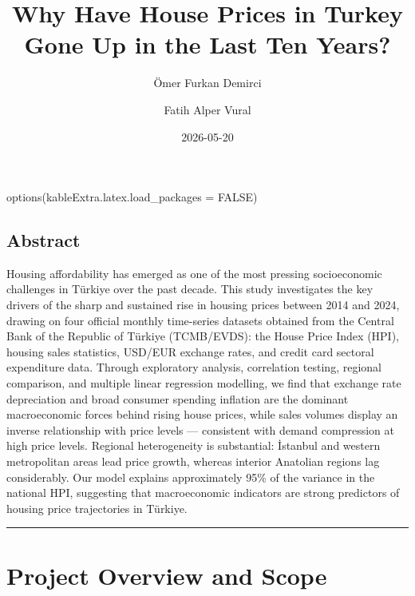\documentclass[
  11pt,
  a4paper,
]{article}
\title{Why Have House Prices in Turkey Gone Up in the Last Ten Years?}
\author{Ömer Furkan Demirci \and Fatih Alper Vural}
\date{2026-05-20}
\newenvironment{Shaded}{\begin{snugshade}}{\end{snugshade}}
\newcommand{\AttributeTok}[1]{\textcolor[rgb]{0.40,0.45,0.13}{#1}}
\newcommand{\ConstantTok}[1]{\textcolor[rgb]{0.56,0.35,0.01}{#1}}
\newcommand{\FunctionTok}[1]{\textcolor[rgb]{0.28,0.35,0.67}{#1}}
\newcommand{\NormalTok}[1]{\textcolor[rgb]{0.00,0.23,0.31}{#1}}
\renewcommand*\contentsname{Table of contents}
\newcommand\contentsname{Table of contents}
\begin{document}
\maketitle

\renewcommand*\contentsname{Table of contents}
{
\setcounter{tocdepth}{3}
\tableofcontents
}

\begin{Shaded}
\begin{Highlighting}[]
\FunctionTok{options}\NormalTok{(}\AttributeTok{kableExtra.latex.load\_packages =} \ConstantTok{FALSE}\NormalTok{)}
\end{Highlighting}
\end{Shaded}

\subsection*{Abstract}\label{abstract}

Housing affordability has emerged as one of the most pressing
socioeconomic challenges in Türkiye over the past decade. This study
investigates the key drivers of the sharp and sustained rise in housing
prices between 2014 and 2024, drawing on four official monthly
time-series datasets obtained from the Central Bank of the Republic of
Türkiye (TCMB/EVDS): the House Price Index (HPI), housing sales
statistics, USD/EUR exchange rates, and credit card sectoral expenditure
data. Through exploratory analysis, correlation testing, regional
comparison, and multiple linear regression modelling, we find that
exchange rate depreciation and broad consumer spending inflation are the
dominant macroeconomic forces behind rising house prices, while sales
volumes display an inverse relationship with price levels --- consistent
with demand compression at high price levels. Regional heterogeneity is
substantial: İstanbul and western metropolitan areas lead price growth,
whereas interior Anatolian regions lag considerably. Our model explains
approximately 95\% of the variance in the national HPI, suggesting that
macroeconomic indicators are strong predictors of housing price
trajectories in Türkiye.

\begin{center}\rule{0.5\linewidth}{0.5pt}\end{center}

\section{Project Overview and Scope}\label{project-overview-and-scope}
\end{document}
